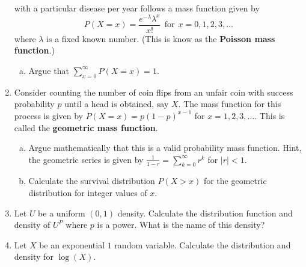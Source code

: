 \documentclass[12pt]{article}
\begin{document}
\begin{enumerate}[1.]
with a particular disease per year follows a mass function given by 
$$
P(X = x) = \frac{e^{-\lambda} \lambda^x}{x!} ~~ \mbox{for} ~~ x = 0, 1, 2, 3, \ldots
$$
where $\lambda$ is a fixed known number. (This is know as the {\bf Poisson mass function}.)
\begin{enumerate}[a.]
\item Argue that $\sum_{x=0}^\infty P(X = x) = 1$.
\end{enumerate}
\item Consider counting the number of coin flips from an unfair coin with success probability $p$ until a head is obtained, say $X$. The mass
function for this process is given by $P(X = x) = p(1 - p)^{x-1}$ for $x = 1, 2, 3, \ldots$.
This is called the {\bf geometric mass function}.
\begin{enumerate}[a.]
\item Argue mathematically that this is a valid probability mass function. Hint, the geometric series is given by $\frac{1}{1-r} = \sum_{k=0}^\infty r^k$ for $|r| < 1$. 
\item Calculate the survival distribution $P(X > x)$ for the geometric distribution for
integer values of $x$.
\end{enumerate}
\item Let $U$ be a uniform $(0,1)$ density. Calculate the distribution function and density of $U^P$ where $p$ is a power. What is the name of this density?
\item Let $X$ be an exponential $1$ random variable. Calculate the distribution and density for $\log(X)$.

\end{enumerate}
\end{document}
